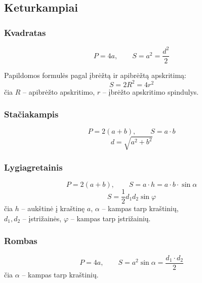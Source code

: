 \subsection{Keturkampiai}

\subsubsection*{Kvadratas}

\begin{tcolorbox}[title={Kvadratas (kraštinė $a$, įstrižainė $d$)}]
\[
P = 4a, \qquad S = a^2 = \frac{d^2}{2}
\]
\end{tcolorbox}

Papildomos formulės pagal įbrėžtą ir apibrėžtą apskritimą:
\[
S = 2R^2 = 4r^2
\]
čia $R$ – apibrėžto apskritimo, $r$ – įbrėžto apskritimo spindulys.

\subsubsection*{Stačiakampis}

\begin{tcolorbox}[title={Stačiakampis (kraštinės $a$, $b$, įstrižainė $d$)}]
\[
P = 2(a+b), \qquad S = a \cdot b
\]
\[
d = \sqrt{a^2 + b^2}
\]
\end{tcolorbox}

\subsubsection*{Lygiagretainis}

\begin{tcolorbox}[title={Lygiagretainis}]
\[
P = 2(a+b), \qquad S = a \cdot h = a \cdot b \cdot \sin\alpha
\]
\[
S = \frac{1}{2} d_1 d_2 \sin\varphi
\]
čia $h$ – aukštinė į kraštinę $a$, $\alpha$ – kampas tarp kraštinių, \\
$d_1, d_2$ – įstrižainės, $\varphi$ – kampas tarp įstrižainių.
\end{tcolorbox}

\subsubsection*{Rombas}

\begin{tcolorbox}[title={Rombas (kraštinė $a$, įstrižainės $d_1$, $d_2$)}]
\[
P = 4a, \qquad S = a^2\sin\alpha = \frac{d_1 \cdot d_2}{2}
\]
čia $\alpha$ – kampas tarp kraštinių.
\end{tcolorbox}

